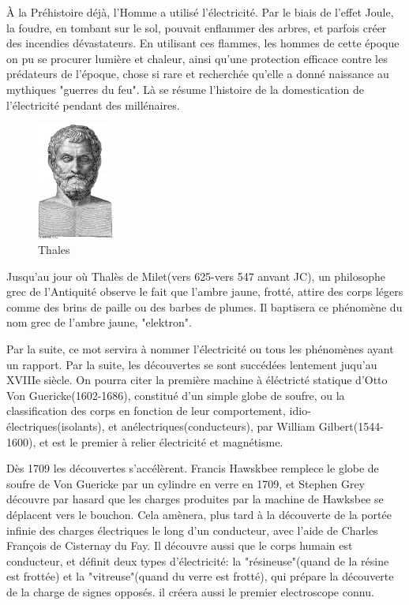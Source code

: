 \documentclass[11pt]{report}
\begin{document}
	    À la Préhistoire déjà, l'Homme a utilisé l'électricité. Par le biais de l'effet Joule, la foudre, en tombant sur le sol, pouvait enflammer des arbres, et parfois créer des incendies dévastateurs. En utilisant ces flammes, les hommes de cette époque on pu se procurer lumière et chaleur, ainsi qu'une protection efficace contre les prédateurs de l'époque, chose si rare et recherchée qu'elle a donné naissance au mythiques "guerres du feu". Là se résume l'histoire de la domestication de l'électricité pendant des millénaires.
\begin{figure}
  \begin{center}
    \includegraphics[width=0.225\textwidth]{thales}
  \end{center}
  \caption{Thales}
\end{figure} Jusqu'au jour où Thalès de Milet(vers 625-vers 547 anvant JC), un philosophe grec de l'Antiquité observe le fait que l'ambre jaune, frotté, attire des corps légers comme des brins de paille ou des barbes de plumes. Il baptisera ce phénomène du nom grec de l'ambre jaune, "elektron".

  Par la suite, ce mot servira à nommer l'électricité ou tous les phénomènes ayant un rapport. Par la suite, les découvertes se sont succédées lentement juqu'au XVIIIe siècle. On pourra citer la première machine à éléctricté statique d'Otto Von Guericke(1602-1686), constitué d'un simple globe de soufre, ou la classification des corps en fonction de leur comportement, idio-électriques(isolants), et anélectriques(conducteurs), par William Gilbert(1544-1600), et est le premier à relier électricité et magnétisme.

    Dès 1709 les découvertes s'accélèrent. Francis Hawskbee remplece le globe de soufre de Von Guericke par un cylindre en verre en 1709, et Stephen Grey découvre par hasard que les charges produites par la machine de Hawksbee se déplacent vers le bouchon. Cela amènera, plus tard à la découverte de la portée infinie des charges électriques le long d'un conducteur, avec l'aide de Charles François de Cisternay du Fay. Il découvre aussi que le corps humain est conducteur, et définit deux types d'électricité: la "résineuse"(quand de la résine est frottée) et la "vitreuse"(quand du verre est frotté), qui prépare la découverte de la charge de signes opposés. il créera aussi le premier electroscope connu.
\end{document}
